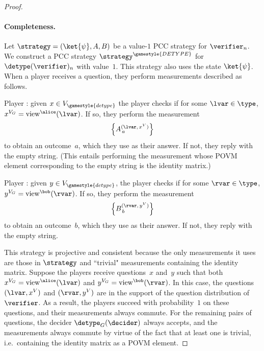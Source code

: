 \begin{proof}
\paragraph{Completeness.}
Let $\strategy = (\ket{\psi},A, B)$ be a value-$1$ PCC strategy for
$\verifier_n$.
We construct a PCC strategy $\strategy^{\gamestyle{DETYPE}}$ for
$\detype(\verifier)_n$ with value~$1$.
This strategy also uses the state $\ket{\psi}$. 
When a player receives a question, they perform measurements described as
follows.
\begin{description}
\item Player \alice: given $x \in V_{\gamestyle{detype}}$ the player checks if
  for some $\lvar \in \type$, $x^{V_G} = \mathrm{view}^\alice(\lvar)$.
	If so, they perform the
  measurement
  \begin{equation*}
    \Big\{ A^{(\lvar,\, x^V)}_{\, a} \Big\}
  \end{equation*}
  to obtain an outcome~$a$, which they use as their answer.
	If not, they reply with the empty string.
	(This entails performing the measurement whose POVM element corresponding to
  the empty string is the identity matrix.)
\item Player \bob: given $y \in V_{\gamestyle{detype}}$, the player checks if
  for some $\rvar \in \type$, $y^{V_G} = \mathrm{view}^\bob(\rvar)$.
	If so, they perform the measurement
  \begin{equation*}
    \Big\{ B^{(\rvar,\, y^V)}_{\, b} \Big\}
  \end{equation*}
  to obtain an outcome~$b$, which they use as their answer.
	If not, they reply with the empty string.
\end{description}
This strategy is projective and consistent because the only measurements it uses
are those in $\strategy$ and ``trivial" measurements containing the identity
matrix.
Suppose the players receive questions~$x$ and~$y$ such that both $x^{V_G} =
\mathrm{view}^\alice(\lvar)$ and $y^{V_G} = \mathrm{view}^\bob(\rvar)$.
In this case, the questions $(\lvar, x^{V})$ and $(\rvar, y^{V})$ are in the
support of the question distribution of $\verifier$.
As a result, the players succeed with probability~$1$ on these questions, and
their measurements always commute.
For the remaining pairs of questions, the decider $\detype_G(\decider)$ always
accepts, and the measurements always commute by virtue of the fact that at least
one is trivial, i.e.\ containing the identity matrix as a POVM element.


\end{proof}

